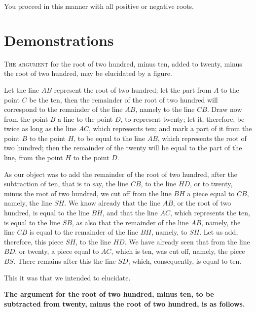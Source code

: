 You proceed in this manner with all positive or negative roots.

\clearpage

\section*{Demonstrations}

\lettrine{T}{he argument} for the root of two hundred, minus ten, added to twenty, minus the root of two hundred, may be elucidated by a figure.

Let the line $AB$ represent the root of two hundred; let the part from $A$ to the point $C$ be the ten, then the remainder of the root of two hundred will correspond to the remainder of the line $AB$, namely to the line $CB$. Draw now from the point $B$ a line to the point $D$, to represent twenty; let it, therefore, be twice as long as the line $AC$, which represents ten; and mark a part of it from the point $B$ to the point $H$, to be equal to the line $AB$, which represents the root of two hundred; then the remainder of the twenty will be equal to the part of the line, from the point $H$ to the point $D$.

As our object was to add the remainder of the root of two hundred, after the subtraction of ten, that is to say, the line $CB$, to the line $HD$, or to twenty, minus the root of two hundred, we cut off from the line $BH$ a piece equal to $CB$, namely, the line $SH$. We know already that the line $AB$, or the root of two hundred, is equal to the line $BH$, and that the line $AC$, which represents the ten, is equal to the line $SB$, as also that the remainder of the line $AB$, namely, the line $CB$ is equal to the remainder of the line $BH$, namely, to $SH$. Let us add, therefore, this piece $SH$, to the line $HD$. We have already seen that from the line $BD$, or twenty, a piece equal to $AC$, which is ten, was cut off, namely, the piece $BS$. There remains after this the line $SD$, which, consequently, is equal to ten.

This it was that we intended to elucidate.

\vspace{0.3cm}
\noindent\textbf{The argument for the root of two hundred, minus ten, to be subtracted from twenty, minus the root of two hundred, is as follows.}

